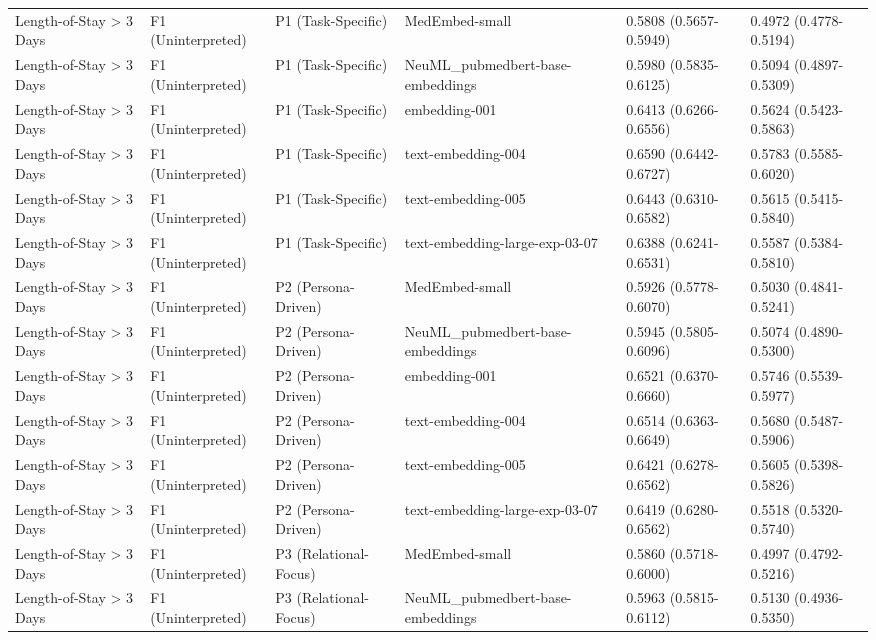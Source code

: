 \documentclass[border=0pt]{standalone}
\begin{document}
\begin{adjustbox}{width=\textwidth}
\begin{tabular}{llllll}
Length-of-Stay \textgreater{} 3 Days & F1 (Uninterpreted) & P1 (Task-Specific) & MedEmbed-small & 0.5808 (0.5657-0.5949) & 0.4972 (0.4778-0.5194) \\
Length-of-Stay \textgreater{} 3 Days & F1 (Uninterpreted) & P1 (Task-Specific) & NeuML\_pubmedbert-base-embeddings & 0.5980 (0.5835-0.6125) & 0.5094 (0.4897-0.5309) \\
Length-of-Stay \textgreater{} 3 Days & F1 (Uninterpreted) & P1 (Task-Specific) & embedding-001 & 0.6413 (0.6266-0.6556) & 0.5624 (0.5423-0.5863) \\
Length-of-Stay \textgreater{} 3 Days & F1 (Uninterpreted) & P1 (Task-Specific) & text-embedding-004 & 0.6590 (0.6442-0.6727) & 0.5783 (0.5585-0.6020) \\
Length-of-Stay \textgreater{} 3 Days & F1 (Uninterpreted) & P1 (Task-Specific) & text-embedding-005 & 0.6443 (0.6310-0.6582) & 0.5615 (0.5415-0.5840) \\
Length-of-Stay \textgreater{} 3 Days & F1 (Uninterpreted) & P1 (Task-Specific) & text-embedding-large-exp-03-07 & 0.6388 (0.6241-0.6531) & 0.5587 (0.5384-0.5810) \\
Length-of-Stay \textgreater{} 3 Days & F1 (Uninterpreted) & P2 (Persona-Driven) & MedEmbed-small & 0.5926 (0.5778-0.6070) & 0.5030 (0.4841-0.5241) \\
Length-of-Stay \textgreater{} 3 Days & F1 (Uninterpreted) & P2 (Persona-Driven) & NeuML\_pubmedbert-base-embeddings & 0.5945 (0.5805-0.6096) & 0.5074 (0.4890-0.5300) \\
Length-of-Stay \textgreater{} 3 Days & F1 (Uninterpreted) & P2 (Persona-Driven) & embedding-001 & 0.6521 (0.6370-0.6660) & 0.5746 (0.5539-0.5977) \\
Length-of-Stay \textgreater{} 3 Days & F1 (Uninterpreted) & P2 (Persona-Driven) & text-embedding-004 & 0.6514 (0.6363-0.6649) & 0.5680 (0.5487-0.5906) \\
Length-of-Stay \textgreater{} 3 Days & F1 (Uninterpreted) & P2 (Persona-Driven) & text-embedding-005 & 0.6421 (0.6278-0.6562) & 0.5605 (0.5398-0.5826) \\
Length-of-Stay \textgreater{} 3 Days & F1 (Uninterpreted) & P2 (Persona-Driven) & text-embedding-large-exp-03-07 & 0.6419 (0.6280-0.6562) & 0.5518 (0.5320-0.5740) \\
Length-of-Stay \textgreater{} 3 Days & F1 (Uninterpreted) & P3 (Relational-Focus) & MedEmbed-small & 0.5860 (0.5718-0.6000) & 0.4997 (0.4792-0.5216) \\
Length-of-Stay \textgreater{} 3 Days & F1 (Uninterpreted) & P3 (Relational-Focus) & NeuML\_pubmedbert-base-embeddings & 0.5963 (0.5815-0.6112) & 0.5130 (0.4936-0.5350) \\

\end{tabular}
\end{adjustbox}
\end{document}
